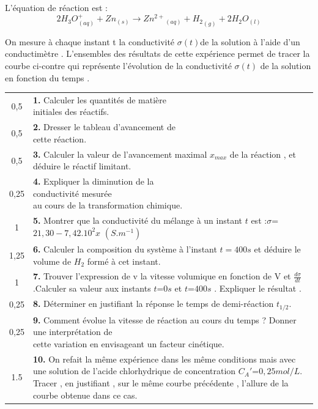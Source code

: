 \documentclass[12pt]{article}
\begin{document}
L’équation de réaction est : $$2H_3O^+_{(aq)} + Zn_{(s)} \rightarrow {Zn^{2+}}_{(aq)} + {H_2}_{(g)} + 2H_2O_{(l)}$$

On mesure à chaque instant t la conductivité $\sigma(t)$de la solution à l’aide d’un
conductimètre . L’ensembles des résultats de cette expérience permet de tracer
la courbe ci-contre qui représente l’évolution de la conductivité $\sigma(t)$
de la solution en fonction du temps .


\begin{tabular}{c|l}
	0,5  & \makecell[l]{ \textbf{1. }Calculer les quantités de matière\\initiales des réactifs.}\\
	0,5  & \makecell[l]{ \textbf{2. }Dresser le tableau d’avancement de\\cette réaction. }\\
	0,5 & \makecell[l]{ \textbf{3. }Calculer la valeur de l’avancement\\maximal $x_{max}$ de la\\réaction , et déduire le réactif limitant.}\\ 
	0,25 & \makecell[l]{ \textbf{4. }Expliquer la diminution de la\\conductivité mesurée  \\au cours de la transformation chimique.}\\
	1	& \makecell[l]{ \textbf{5. }Montrer que la conductivité du\\ 
	mélange à un instant $t$ est :$\sigma$=$21,30 - 7,42.10^2x$ $(S.m^{-1})$}\\
		1,25 & \makecell[l]{ \textbf{6. }Calculer la composition du système à l’instant $t = 400s$ et déduire le volume  de $H_2$ formé à\\cet instant.}\\
		1 & \makecell[l]{\textbf{7. }Trouver l’expression de v la vitesse volumique en fonction de V et $\frac{d\sigma}{dt}$.Calculer sa valeur\\aux instants $t$=$0s$  et $t$=$400s$ . Expliquer le résultat . }\\
		0,25 &  \textbf{8. } Déterminer en justifiant la réponse le temps de demi-réaction $t_{1/2}$.\\
		0,25 & \makecell[l]{ \textbf{9. } Comment évolue la vitesse de réaction au cours du temps ? Donner une interprétation de \\cette variation en envisageant un facteur cinétique.}\\
		1.5 & \makecell[l]{ \textbf{10. } On refait la même expérience dans les même conditions mais avec 
	une solution de l’acide \\chlorhydrique de concentration $C_A'$=$0, 25mol/L$.\\
	Tracer , en justifiant , sur le même courbe précédente , l’allure de la courbe obtenue dans ce cas.}

\end{tabular}
\end{document}
